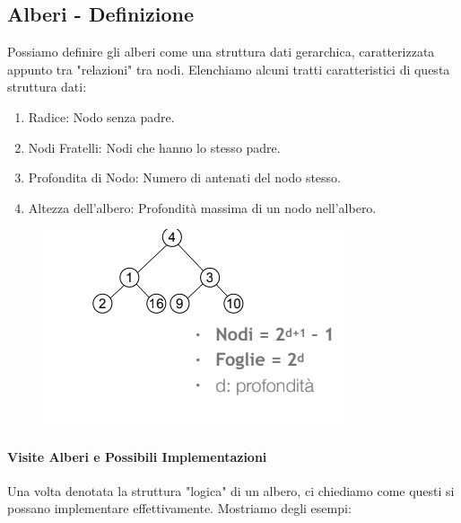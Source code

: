 \documentclass{article}
\begin{document}
\subsection{Alberi - Definizione} Possiamo definire gli alberi come una struttura dati gerarchica, caratterizzata appunto tra "relazioni" tra nodi. Elenchiamo alcuni tratti caratteristici di questa struttura dati:

\begin{enumerate}
    \item Radice: Nodo senza padre.
    \item Nodi Fratelli: Nodi che hanno lo stesso padre.
    \item Profondita di Nodo: Numero di antenati del nodo stesso.
    \item Altezza dell'albero: Profondità massima di un nodo nell'albero.
\end{enumerate}

\begin{figure}[htbp]
    \center
    \includegraphics[scale=0.75]{img/alberoBinCompleto.png}
\end{figure}

\newpage

\paragraph{Visite Alberi e Possibili Implementazioni}

Una volta denotata la struttura "logica" di un albero, ci chiediamo come questi si possano implementare effettivamente. Mostriamo degli esempi:
\end{document}
